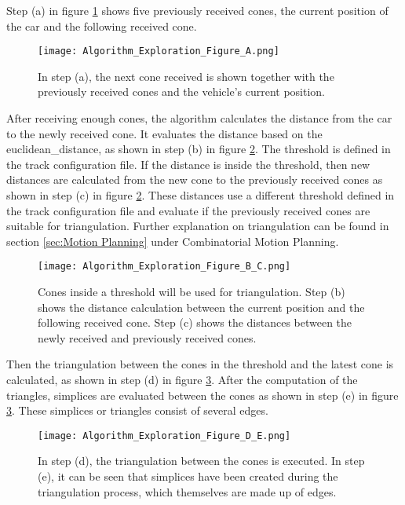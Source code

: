 Step (a) in figure \ref{fig:Algorithm Exploration Figure A} shows five previously received cones, the current position of the car and the following received cone.
\begin{figure}[H]
    \centering
    \texttt{[image: Algorithm\_Exploration\_Figure\_A.png]}
    \caption{In step (a), the next cone received is shown together with the previously received cones and the vehicle's current position.}
    \label{fig:Algorithm Exploration Figure A}
\end{figure}

After receiving enough cones, the algorithm calculates the distance from the car to the newly received cone. It evaluates the distance based on the \Gls{euclidean_distance}, as shown in step (b) in figure \ref{fig:Algorithm Exploration Figure B and C}. The threshold is defined in the track configuration file. If the distance is inside the threshold, then new distances are calculated from the new cone to the previously received cones as shown in step (c) in figure \ref{fig:Algorithm Exploration Figure B and C}. These distances use a different threshold defined in the track configuration file and evaluate if the previously received cones are suitable for \Gls{triangulation}. Further explanation on triangulation can be found in section \ref{sec:Motion Planning} under Combinatorial Motion Planning.
\begin{figure}[H]
    \centering
    \texttt{[image: Algorithm\_Exploration\_Figure\_B\_C.png]}
    \caption{Cones inside a threshold will be used for triangulation. Step (b) shows the distance calculation between the current position and the following received cone. Step (c) shows the distances between the newly received and previously received cones.}
    \label{fig:Algorithm Exploration Figure B and C}
\end{figure}

Then the \Gls{triangulation} between the cones in the threshold and the latest cone is calculated, as shown in step (d) in figure \ref{fig:Algorithm Exploration Figure D and E}. After the computation of the triangles, simplices are evaluated between the cones as shown in step (e) in figure \ref{fig:Algorithm Exploration Figure D and E}. These simplices or triangles consist of several edges.
\begin{figure}[H]
    \centering
    \texttt{[image: Algorithm\_Exploration\_Figure\_D\_E.png]}
    \caption{In step (d), the triangulation between the cones is executed. In step (e), it can be seen that simplices have been created during the triangulation process, which themselves are made up of edges.}
    \label{fig:Algorithm Exploration Figure D and E}
\end{figure}

